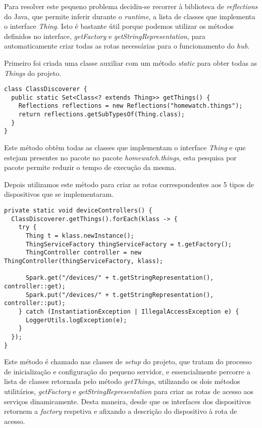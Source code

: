 Para resolver este pequeno problema decidiu-se recorrer à biblioteca de \textit{reflections} do Java, que permite inferir durante o \textit{runtime}, a lista de classes que implementa o interface \textit{Thing}. Isto é bastante útil porque podemos utilizar os métodos definidos no interface, \textit{getFactory} e \textit{getStringRepresentation}, para automaticamente criar todas as rotas necessárias para o funcionamento do \textit{hub}.

Primeiro foi criada uma classe auxiliar com um método \textit{static} para obter todas as \textit{Things} do projeto.

\begin{verbatim}
class ClassDiscoverer {
  public static Set<Class<? extends Thing>> getThings() {
    Reflections reflections = new Reflections("homewatch.things");
    return reflections.getSubTypesOf(Thing.class);
  }
}
\end{verbatim}

Este método obtêm todas as classes que implementam o interface \textit{Thing} e que estejam presentes no pacote no pacote \textit{homewatch.things}, esta pesquisa por pacote permite reduzir o tempo de execução da mesma.

Depois utilizamos este método para criar as rotas correspondentes aos 5 tipos de dispositivos que se implementaram.

\begin{verbatim}
private static void deviceControllers() {
  ClassDiscoverer.getThings().forEach(klass -> {
    try {
      Thing t = klass.newInstance();
      ThingServiceFactory thingServiceFactory = t.getFactory();
      ThingController controller = new ThingController(thingServiceFactory, klass);

      Spark.get("/devices/" + t.getStringRepresentation(), controller::get);
      Spark.put("/devices/" + t.getStringRepresentation(), controller::put);
    } catch (InstantiationException | IllegalAccessException e) {
      LoggerUtils.logException(e);
    }
  });
}
\end{verbatim}

Este método é chamado nas classes de \textit{setup} do projeto, que tratam do processo de inicialização e configuração do pequeno servidor, e essencialmente percorre a lista de classes retornada pelo método \textit{getThings}, utilizando os dois métodos utilitários, \textit{getFactory} e \textit{getStringRepresentation} para criar as rotas de acesso aos serviços dinamicamente. Desta maneira, desde que os interfaces dos dispositivos retornem a \textit{factory} respetiva e afixando a descrição do dispositivo à rota de acesso.

